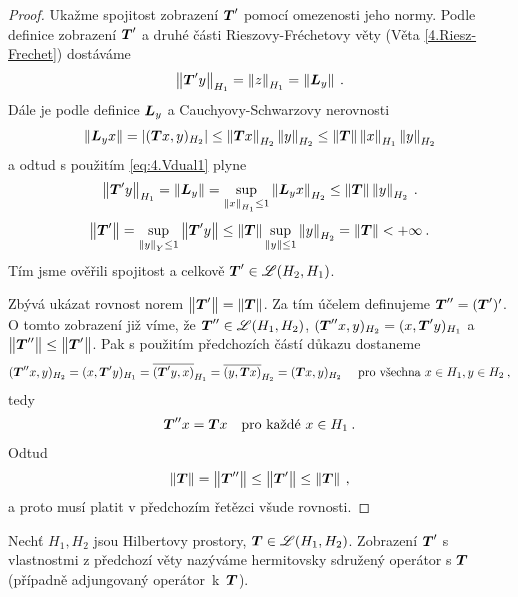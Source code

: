 \begin{proof}
Ukažme spojitost zobrazení $\boldsymbol{T}'$ pomocí omezenosti jeho normy. Podle definice zobrazení $\boldsymbol{T}'$ a druhé části Rieszovy-Fréchetovy věty (Věta \ref{4.Riesz-Frechet}) dostáváme \begin{align} \label{eq:4.Vdual1}
    \left\lVert\boldsymbol{T}' y\right\rVert_{H_1} = \left\lVert z\right\rVert_{H_1} = \left\lVert\boldsymbol{L}_y\right\rVert \:.
\end{align}
Dále je podle definice $\boldsymbol{L}_y$ a Cauchyovy-Schwarzovy nerovnosti \begin{align*}
    \left\lVert\boldsymbol{L}_y x\right\rVert = |(\boldsymbol{T}x, y)_{H_2}| \leq \left\lVert\boldsymbol{T}x\right\rVert_{H_2} \left\lVert y\right\rVert_{H_2} \leq \left\lVert\boldsymbol{T}\right\rVert \left\lVert x\right\rVert_{H_1} \left\lVert y\right\rVert_{H_2}
\end{align*}
a odtud s použitím \eqref{eq:4.Vdual1} plyne
\begin{align*}
    \left\lVert\boldsymbol{T}' y\right\rVert_{H_1} = \left\lVert\boldsymbol{L}_y\right\rVert = \sup_{\left\lVert x\right\rVert_{H_1} \leq 1} \left\lVert\boldsymbol{L}_y x\right\rVert_{H_2} \leq \left\lVert\boldsymbol{T}\right\rVert \left\lVert y\right\rVert_{H_2} \:.
\end{align*}
\begin{align*}
    \left\lVert\boldsymbol{T}'\right\rVert = \sup_{\left\lVert y\right\rVert_Y \leq 1} \left\lVert\boldsymbol{T}' y\right\rVert \leq  \left\lVert\boldsymbol{T}\right\rVert \sup_{\left\lVert y\right\rVert \leq 1} \left\lVert y\right\rVert_{H_2} = \left\lVert\boldsymbol{T}\right\rVert < + \infty \:.
\end{align*}
Tím jsme ověřili spojitost a celkově $\boldsymbol{T}' \in \mathscr{L}(H_2, H_1)$.

Zbývá ukázat rovnost norem $\left\lVert\boldsymbol{T}'\right\rVert = \left\lVert\boldsymbol{T}\right\rVert$. Za tím účelem definujeme $\boldsymbol{T}'' = (\boldsymbol{T}')'$. O tomto zobrazení již víme, že $\boldsymbol{T}'' \in \mathscr{L}(H_1, H_2)$, $(\boldsymbol{T}'' x,y)_{H_2} = (x, \boldsymbol{T}' y)_{H_1}$ a $\left\lVert\boldsymbol{T}''\right\rVert \leq \left\lVert\boldsymbol{T}'\right\rVert$. Pak s použitím předchozích částí důkazu dostaneme \begin{align*}
    (\boldsymbol{T}'' x,y)_{H_2} = (x, \boldsymbol{T}'y)_{H_1} = \overline{(\boldsymbol{T}' y, x)}_{H_1} = \overline{(y, \boldsymbol{T} x)}_{H_2} = (\boldsymbol{T} x,y)_{H_2} \quad \text{ pro všechna } x \in H_1, y \in H_2 \:,
\end{align*}
tedy \begin{align*}
    \boldsymbol{T}'' x= \boldsymbol{T} x \quad \text{pro každé } x \in H_1 \:.
\end{align*}
Odtud \begin{align*}
    \left\lVert\boldsymbol{T}\right\rVert = \left\lVert\boldsymbol{T}''\right\rVert \leq \left\lVert\boldsymbol{T}'\right\rVert \leq \left\lVert\boldsymbol{T}\right\rVert \:,
\end{align*}
a proto musí platit v předchozím řetězci všude rovnosti.
\end{proof}
\begin{definition}
Nechť $H_1, H_2$ jsou Hilbertovy prostory, $\boldsymbol{T} \in \mathscr{L} (H_1, H_2) $. Zobrazení $\boldsymbol{T}'$ s vlastnostmi z předchozí věty nazýváme hermitovsky sdružený operátor s $\boldsymbol{T}$ (případně adjungovaný operátor~k~$\boldsymbol{T}$).
\end{definition}

